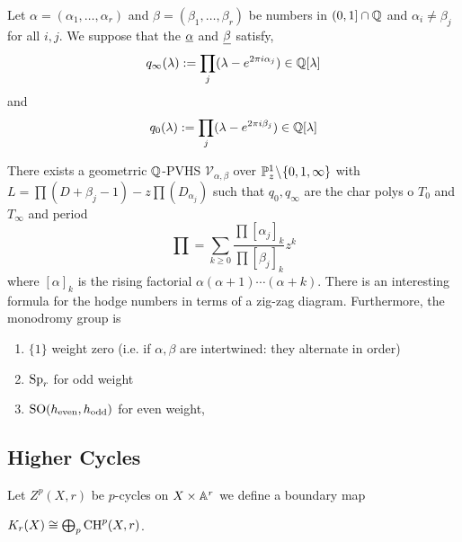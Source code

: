 \documentclass[12pt]{article}
\begin{document}
Let $\alpha = (\alpha_1, \dots, \alpha_r)$ and $\beta = (\beta_1, \dots, \beta_r)$ be numbers in $(0, 1] \cap \mathbb{Q}$ and $\alpha_i \neq \beta_j$ for all $i, j$. We suppose that the $\underline{\alpha}$ and $\underline{\beta}$ satisfy, 
\[ q_\infty(\lambda) := \prod_j (\lambda - e^{2 \pi i \alpha_j})  \in \mathbb{Q}[\lambda] \]
and 
\[ q_0(\lambda) := \prod_j (\lambda - e^{2 \pi i \beta_j}) \in \mathbb{Q}[\lambda] \]

\begin{theorem}
There exists a geometrric $\mathbb{Q}$-PVHS $\mathcal{V}_{\alpha,\beta}$ over $\mathbb{P}^1_z \! \setminus \! \{ 0, 1, \infty \}$ with $L = \prod (D + \beta_j - 1) - z \prod( D _ \alpha_j)$ such that $q_0, q_\infty$ are the char polys o $T_0$ and $T_\infty$ and period
\[ \prod = \sum_{k \ge 0} \frac{\prod [\alpha_j]_k}{\prod [\beta_j]_k} z^k \]
where $[\alpha]_k$ is the rising factorial $\alpha (\alpha + 1) \cdots (\alpha + k)$.
There is an interesting formula for the hodge numbers in terms of a zig-zag diagram. Furthermore, the monodromy group is
\begin{enumerate}
\item $\{ 1 \}$ weight zero (i.e. if $\alpha, \beta$ are intertwined: they alternate in order)
\item  $\mathrm{Sp}_r$ for odd weight
\item $\mathrm{SO}(h_{\text{even}}, h_{\text{odd}})$ for even weight,
\end{enumerate}  
\end{theorem}


\subsection{Higher Cycles}

Let $Z^p(X, r)$ be $p$-cycles on $X \times \mathbb{A}^r$ we define a boundary map 

$K_r(X) \cong \bigoplus_p \mathrm{CH}^p(X, r)$.
\end{document}
